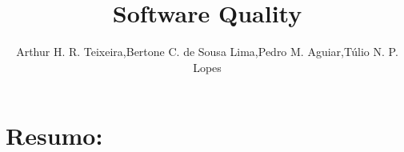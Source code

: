 \documentclass[12pt]{article}
\title{Software Quality}
\author{Arthur H. R. Teixeira\inst{1},Bertone C. de Sousa Lima\inst{1},Pedro M. Aguiar\inst{1},Túlio N. P. Lopes\inst{1}}
\begin{document}
 
	
	\maketitle
	\section{Resumo:}
	
	
	
	
	
	
	
	
	
	
	
	
	

	
	
	
	
	
\end{document}
